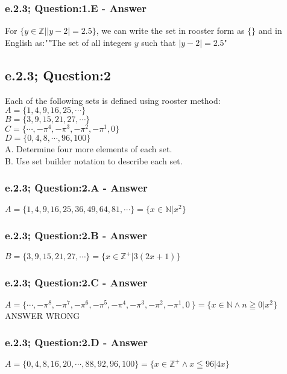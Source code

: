 \subsubsection*{e.2.3; Question:1.E - Answer}
For $\{ y \in \mathbb{Z}| |y-2|=2.5 \}$, we can write the set in rooster form as $ \{ \}$ and in English as:""The set of all integers $y$ such that $|y-2|=2.5$"


\subsection{e.2.3; Question:2}
Each of the following sets is defined using rooster method: \\
$A = \{1, 4, 9, 16, 25, \cdots \}$ \\
$B = \{3, 9, 15, 21, 27, \cdots \}$ \\
$C = \{\cdots, -\pi^4, -\pi^3, -\pi^2, -\pi^1,0 \}$ \\
$D = \{0, 4, 8, \cdots, 96, 100 \}$ \\
A. Determine four more elements of each set. \\
B. Use set builder notation to describe each set. \\

\subsubsection*{e.2.3; Question:2.A - Answer}
$A = \{1, 4, 9, 16, 25,36, 49, 64, 81, \cdots \} = \{ x \in \mathbb{N}| x^2\}$ \\

\subsubsection*{e.2.3; Question:2.B - Answer}
$B = \{3, 9, 15, 21, 27, \cdots \} = \{ x \in \mathbb{Z^+}| 3(2x + 1)\}$ \\

\subsubsection*{e.2.3; Question:2.C - Answer}
$A = \{\cdots, -\pi^8, -\pi^7, -\pi^6, -\pi^5, -\pi^4, -\pi^3, -\pi^2, -\pi^1,0 \ \} = \{ x \in \mathbb{N} \wedge n \geqq 0| x^2\}$ ANSWER WRONG\\

\subsubsection*{e.2.3; Question:2.D - Answer}
$A = \{0, 4, 8, 16, 20, \cdots, 88, 92, 96, 100 \} = \{ x \in \mathbb{Z^+}\wedge x \leqq 96| 4x \}$ \\


